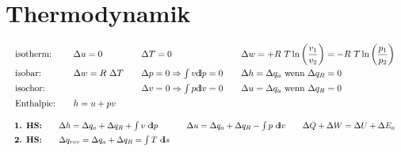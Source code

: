 
\section{Thermodynamik}
%
	\setlength{\abovedisplayskip}{-15pt}
		\[ \arraycolsep=1em %
		\begin{array}{llll}
			\text{isotherm:}  & \Delta u=0           & \Delta T=0                               & \Delta w = + R\ T  \ln \left(\dfrac{v_1}{v_2} \right) = - R\ T \ln \left(\dfrac{p_1}{p_2}\right) \\
			\text{isobar:}    & \Delta w=R\ \Delta T & \Delta p=0 \Rightarrow \int{}v\dd p=0    & \Delta h = \Delta q_a \text{ wenn } \Delta q_R=0                                                 \\
			\text{isochor:}   &                      & \Delta v=0 \Rightarrow \int p\dd v=0     & \Delta u = \Delta q_a \text{ wenn } \Delta q_R=0                                                 \\
			\text{Enthalpie:} & h=u+pv               & %
		\end{array} \]
	\setlength{\abovedisplayshortskip}{-10pt}
		\[ \arraycolsep=1em  \def\arraystretch{1.4}
		\begin{array}{llll}
			\textbf{1. HS:} & \Delta h = \Delta q_a + \Delta q_R + \int v\ \dd p    & \Delta u = \Delta q_a + \Delta q_R - \int p\ \dd v & \Delta Q + \Delta W = \Delta U + \Delta E_a \\
			\textbf{2. HS:} & \Delta q_{rev}=\Delta q_a + \Delta q_R= \int T\ \dd s &                                                    &
		\end{array} \]

